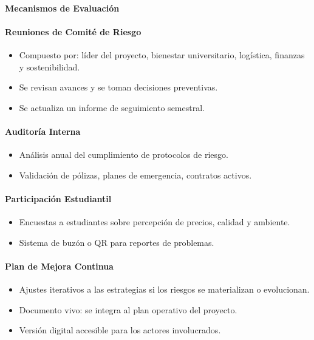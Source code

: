 \documentclass[letterpaper, 11pt]{report}
\begin{document}
\paragraph{Mecanismos de Evaluación}

\paragraph{Reuniones de Comité de Riesgo}
\begin{itemize}
      \item Compuesto por: líder del proyecto, bienestar universitario, logística, finanzas y sostenibilidad.
      \item Se revisan avances y se toman decisiones preventivas.
      \item Se actualiza un informe de seguimiento semestral.
\end{itemize}

\paragraph{Auditoría Interna}
\begin{itemize}
      \item Análisis anual del cumplimiento de protocolos de riesgo.
      \item Validación de pólizas, planes de emergencia, contratos activos.
\end{itemize}

\paragraph{Participación Estudiantil}
\begin{itemize}
      \item Encuestas a estudiantes sobre percepción de precios, calidad y ambiente.
      \item Sistema de buzón o QR para reportes de problemas.
\end{itemize}

\paragraph{Plan de Mejora Continua}
\begin{itemize}
      \item Ajustes iterativos a las estrategias si los riesgos se materializan o evolucionan.
      \item Documento vivo: se integra al plan operativo del proyecto.
      \item Versión digital accesible para los actores involucrados.
\end{itemize}
\end{document}
